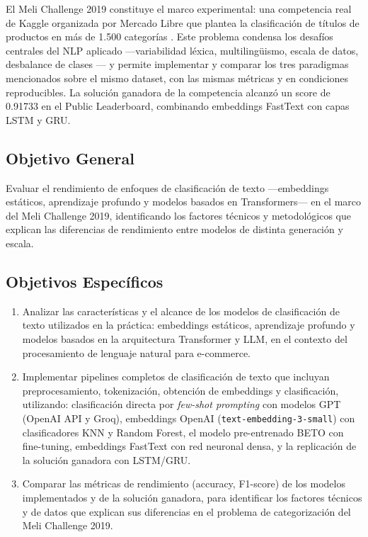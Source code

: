 \documentclass[11pt,a4paper]{article}
\begin{document}
El Meli Challenge 2019 constituye el marco experimental: una competencia real de Kaggle organizada por Mercado Libre que plantea la clasificación de títulos de productos en más de 1.500 categorías \cite{meli2019}. Este problema condensa los desafíos centrales del NLP aplicado ---variabilidad léxica, multilingüismo, escala de datos, desbalance de clases \cite{he2009}--- y permite implementar y comparar los tres paradigmas mencionados sobre el mismo dataset, con las mismas métricas y en condiciones reproducibles. La solución ganadora de la competencia alcanzó un score de 0.91733 en el Public Leaderboard, combinando embeddings FastText con capas LSTM y GRU.

\subsection{Objetivo General}

Evaluar el rendimiento de enfoques de clasificación de texto ---embeddings estáticos, aprendizaje profundo y modelos basados en Transformers--- en el marco del Meli Challenge 2019, identificando los factores técnicos y metodológicos que explican las diferencias de rendimiento entre modelos de distinta generación y escala.

\subsection{Objetivos Específicos}

\begin{enumerate}
    \item Analizar las características y el alcance de los modelos de clasificación de texto utilizados en la práctica: embeddings estáticos, aprendizaje profundo y modelos basados en la arquitectura Transformer y LLM, en el contexto del procesamiento de lenguaje natural para e-commerce.
    \item Implementar pipelines completos de clasificación de texto que incluyan preprocesamiento, tokenización, obtención de embeddings y clasificación, utilizando: clasificación directa por \emph{few-shot prompting} con modelos GPT (OpenAI API y Groq), embeddings OpenAI (\texttt{text-embedding-3-small}) con clasificadores KNN y Random Forest, el modelo pre-entrenado BETO con fine-tuning, embeddings FastText con red neuronal densa, y la replicación de la solución ganadora con LSTM/GRU.
    \item Comparar las métricas de rendimiento (accuracy, F1-score) de los modelos implementados y de la solución ganadora, para identificar los factores técnicos y de datos que explican sus diferencias en el problema de categorización del Meli Challenge 2019.
\end{enumerate}
\end{document}
